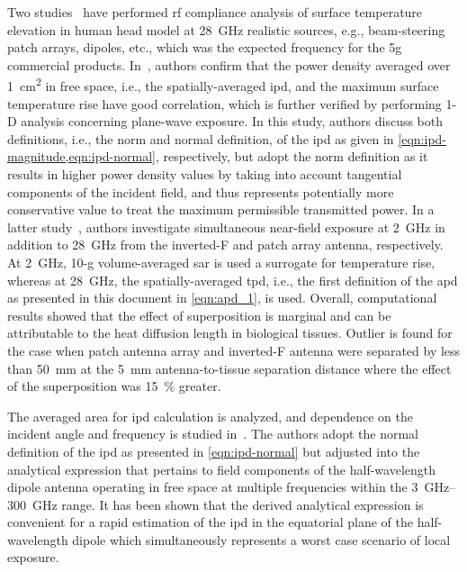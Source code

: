 Two studies~\cite{He2018RF,Miura2021Power} have performed \gls{rf} compliance analysis of surface temperature elevation in human head model at \SI{28}{\GHz} realistic sources, e.g., beam-steering patch arrays, dipoles, etc., which was the expected frequency for the \gls{5g} commercial products.
In~\cite{He2018RF}, authors confirm that the power density averaged over \SI{1}{\cm\squared} in free space, i.e., the spatially-averaged \gls{ipd}, and the maximum surface temperature rise have good correlation, which is further verified by performing 1-D analysis concerning plane-wave exposure. 
In this study, authors discuss both definitions, i.e., the norm and normal definition, of the \gls{ipd} as given in \cref{eqn:ipd-magnitude,eqn:ipd-normal}, respectively, but adopt the norm definition as it results in higher power density values by taking into account tangential components of the incident field, and thus represents potentially more conservative value to treat the maximum permissible transmitted power.
In a latter study~\cite{Miura2021Power}, authors investigate simultaneous near-field exposure at \SI{2}{\GHz} in addition to \SI{28}{\GHz} from the inverted-F and patch array antenna, respectively.
At \SI{2}{\GHz}, 10-g volume-averaged \gls{sar} is used a surrogate for temperature rise, whereas at \SI{28}{\GHz}, the spatially-averaged \gls{tpd}, i.e., the first definition of the \gls{apd} as presented in this document in \cref{eqn:apd_1}, is used.
Overall, computational results showed that the effect of superposition is marginal and can be attributable to the heat diffusion length in biological tissues.
Outlier is found for the case when patch antenna array and inverted-F antenna were separated by less than \SI{50}{\mm} at the \SI{5}{\mm} antenna-to-tissue separation distance where the effect of the superposition was \SI{15}{\percent} greater.

The averaged area for \gls{ipd} calculation is analyzed, and dependence on the incident angle and frequency is studied in~\cite{Poljak2018On}.
The authors adopt the normal definition of the \gls{ipd} as presented in \cref{eqn:ipd-normal} but adjusted into the analytical expression that pertains to field components of the half-wavelength dipole antenna operating in free space at multiple frequencies within the \SIrange[range-units=single,range-phrase=--]{3}{300}{\GHz} range.
It has been shown that the derived analytical expression is convenient for a rapid estimation of the \gls{ipd} in the equatorial plane of the half-wavelength dipole which simultaneously represents a worst case scenario of local exposure.

